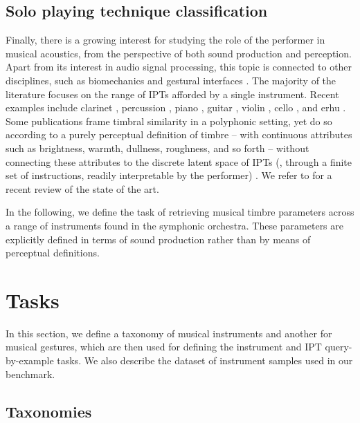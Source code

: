 \subsection{Solo playing technique classification}
Finally, there is a growing interest for studying the role of the performer in musical acoustics, from the perspective of both sound production and perception.
Apart from its interest in audio signal processing, this topic is connected to other disciplines, such as biomechanics and gestural interfaces \cite{metcalf2014frontiers}.
The majority of the literature focuses on the range of IPTs afforded by a single instrument.
Recent examples include clarinet \cite{loureiro2004ismir}, percussion \cite{tindale2004ismir}, piano \cite{bernays2013smc}, guitar \cite{foulon2013cmmr,su2014ismir,chen2015ismir}, violin \cite{young2008nime}, cello \cite[chapter 6]{chudy2016phd}, and erhu \cite{yang2014fma}.
Some publications frame timbral similarity in a polyphonic setting, yet do so according to a purely perceptual definition of timbre -- with continuous attributes such as brightness, warmth, dullness, roughness, and so forth -- without connecting these attributes to the discrete latent space of IPTs (\ie{}, through a finite set of instructions, readily interpretable by the performer) \cite{antoine2018isma}.
We refer to \cite{leman2017chapter} for a recent review of the state of the art.

In the following, we define the task of retrieving musical timbre parameters across a range of instruments found in the symphonic orchestra.
These parameters are explicitly defined in terms of sound production rather than by means of perceptual definitions.

\section{Tasks}
In this section, we define a taxonomy of musical instruments and another for musical gestures, which are then used for defining the instrument and IPT query-by-example tasks.
We also describe the dataset of instrument samples used in our benchmark.

\subsection{Taxonomies}

